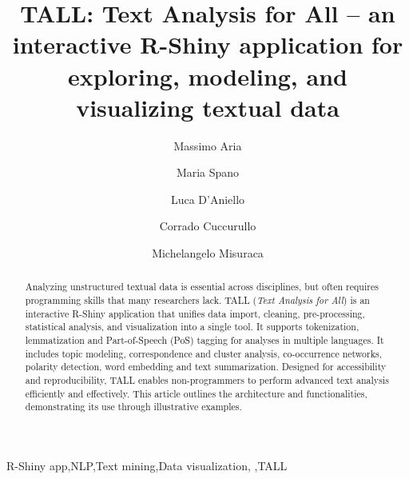 \documentclass[preprint,12pt,a4paper]{elsarticle}
\begin{document}
\renewcommand{\labelenumii}{\arabic{enumi}.\arabic{enumii}}

\begin{frontmatter}
 


\title{TALL: Text Analysis for All -- an interactive \textsf{R}-Shiny application for exploring, modeling, and visualizing textual data}


\author[label1,label4]{Massimo Aria}
\author[label1,label4]{Maria Spano}
\author[label1,label4]{Luca D'Aniello}
\author[label2,label4]{Corrado Cuccurullo}
\author[label3,label4]{Michelangelo Misuraca}
\address[label1]{Dep. of Economics \& Statistics, University of Naples Federico II, Naples, Italy}
\address[label2]{Dep. of Economics, University of Campania Luigi Vanvitelli, Capua (CE), Italy}
\address[label3]{Dep. of Management \& Innovation Systems, University of Salerno, Fisciano (SA), Italy}
\address[label4]{K-Synth, Naples, Italy}

\begin{abstract}
Analyzing unstructured textual data is essential across disciplines, but often requires programming skills that many researchers lack. TALL (\textit{Text Analysis for All}) is an interactive \textsf{R}-Shiny application that unifies data import, cleaning, pre-processing, statistical analysis, and visualization into a single tool. It supports tokenization, lemmatization and Part-of-Speech (PoS) tagging for analyses in multiple languages. It includes topic modeling, correspondence and cluster analysis, co-occurrence networks, polarity detection, word embedding and text summarization. Designed for accessibility and reproducibility, TALL enables non-programmers to perform advanced text analysis efficiently and effectively. This article outlines the architecture and functionalities, demonstrating its use through illustrative examples.
\end{abstract}

\begin{keyword}
\textsf{R}-Shiny app\sep NLP\sep Text mining\sep Data visualization, \sep TALL

\end{keyword}

\end{frontmatter}
\end{document}

